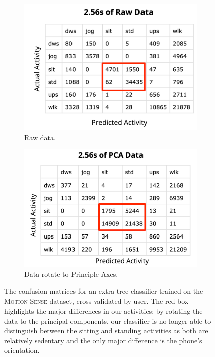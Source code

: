 \begin{figure}[ht]
\begin{subfigure}{.5\textwidth}
  \centering
  \includegraphics[width = \textwidth]{images/comparisons/conf_raw.png}
   \caption{Raw data.}
     \label{fig:cm-raw}
\end{subfigure}
\begin{subfigure}{.5\textwidth}
  \centering
   \includegraphics[width = \textwidth]{images/comparisons/conf_pca.png}
    \caption{Data rotate to Principle Axes.}
     \label{fig:cm-pca}
\end{subfigure}
\caption{The confusion matrices for an extra tree classifier trained on the \textsc{Motion Sense} dataset, cross validated by user. The red box highlights the major differences in our activities: by rotating the data to the principal components, our classifier is no longer able to distinguish between the sitting and standing activities as both are relatively sedentary and the only major difference is the phone's orientation.}
\label{fig:confusion_mat}
\end{figure}




